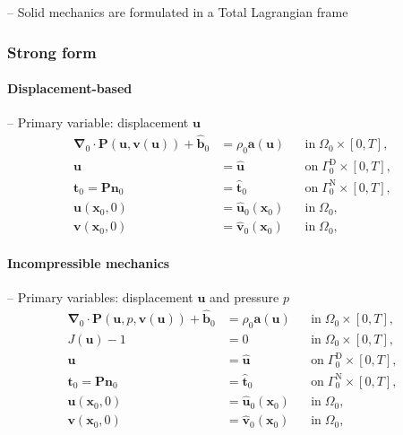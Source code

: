 \documentclass[a4paper,12pt]{report}
\newcommand{\bs}[1]{\boldsymbol{#1}}
\newcommand{\Om}{\mathit{\Omega}}
\newcommand{\Gm}{\mathit{\Gamma}}
\begin{document}
-- Solid mechanics are formulated in a Total Lagrangian frame

\subsubsection{Strong form}

\paragraph{Displacement-based}
-- Primary variable: displacement $\bs{u}$
\begin{align}
\bs{\nabla}_{0} \cdot \bs{P}(\bs{u},\bs{v}(\bs{u})) + \hat{\bs{b}}_{0} &= \rho_{0} \bs{a}(\bs{u}) &&\text{in} \; \mathit{\Omega}_{0} \times [0, T], \label{eq:divP} \\
\bs{u} &= \hat{\bs{u}} &&\text{on} \; \mathit{\Gamma}_{0}^{\mathrm{D}} \times [0, T], \label{eq:bc_u}\\
\bs{t}_{0} = \bs{P}\bs{n}_{0} &= \hat{\bs{t}}_{0} &&\text{on} \; \mathit{\Gamma}_{0}^{\mathrm{N}} \times [0, T], \label{eq:bc_N}\\
\bs{u}(\bs{x}_{0},0) &= \hat{\bs{u}}_{0}(\bs{x}_{0}) &&\text{in} \; \mathit{\Omega}_{0}, \label{eq:ini_u}\\
\bs{v}(\bs{x}_{0},0) &= \hat{\bs{v}}_{0}(\bs{x}_{0}) &&\text{in} \; \mathit{\Omega}_{0}, \label{eq:ini_v}
\end{align}

\paragraph{Incompressible mechanics}
-- Primary variables: displacement $\bs{u}$ and pressure $p$
\begin{align}
\bs{\nabla}_{0} \cdot \bs{P}(\bs{u},p,\bs{v}(\bs{u})) + \hat{\bs{b}}_{0} &= \rho_{0} \bs{a}(\bs{u}) &&\text{in} \; \mathit{\Omega}_{0} \times [0, T], \label{eq:divP_inc} \\
J(\bs{u})-1 &= 0 &&\text{in} \; \mathit{\Omega}_{0} \times [0, T], \label{eq:J} \\
\bs{u} &= \hat{\bs{u}} &&\text{on} \; \mathit{\Gamma}_{0}^{\mathrm{D}} \times [0, T], \label{eq:bc_u_inc}\\
\bs{t}_{0} = \bs{P}\bs{n}_{0} &= \hat{\bs{t}}_{0} &&\text{on} \; \mathit{\Gm}_{0}^{\mathrm{N}} \times [0, T], \label{eq:bc_N_inc}\\
\bs{u}(\bs{x}_{0},0) &= \hat{\bs{u}}_{0}(\bs{x}_{0}) &&\text{in} \; \mathit{\Om}_{0}, \label{eq:ini_u_inc}\\
\bs{v}(\bs{x}_{0},0) &= \hat{\bs{v}}_{0}(\bs{x}_{0}) &&\text{in} \; \mathit{\Om}_{0}, \label{eq:ini_v_inc}
\end{align}
\end{document}
